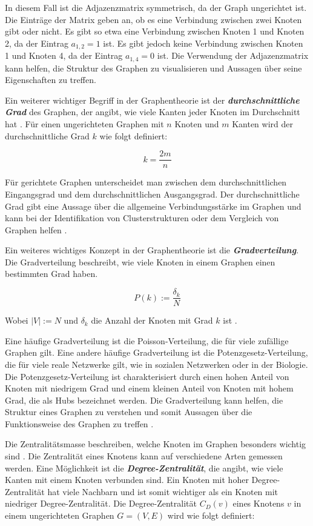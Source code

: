 In diesem Fall ist die Adjazenzmatrix symmetrisch, da der Graph ungerichtet ist. Die Einträge der Matrix geben an, ob es eine Verbindung zwischen zwei Knoten gibt oder nicht. Es gibt so etwa eine Verbindung zwischen Knoten 1 und Knoten 2, da der Eintrag $a_{1,2} = 1$ ist. Es gibt jedoch keine Verbindung zwischen Knoten 1 und Knoten 4, da der Eintrag $a_{1,4} = 0$ ist. Die Verwendung der Adjazenzmatrix kann helfen, die Struktur des Graphen zu visualisieren und Aussagen über seine Eigenschaften zu treffen.

Ein weiterer wichtiger Begriff in der Graphentheorie ist der \textbf{\textit{durchschnittliche Grad}} des Graphen, der angibt, wie viele Kanten jeder Knoten im Durchschnitt hat \cite[p.~48]{barabasi_network_2016}. Für einen ungerichteten Graphen mit $n$ Knoten und $m$ Kanten wird der durchschnittliche Grad $k$ wie folgt definiert:

$$k = \frac{2m}{n}$$

Für gerichtete Graphen unterscheidet man zwischen dem durchschnittlichen Eingangsgrad und dem durchschnittlichen Ausgangsgrad. Der durchschnittliche Grad gibt eine Aussage über die allgemeine Verbindungsstärke im Graphen und kann bei der Identifikation von Clusterstrukturen oder dem Vergleich von Graphen helfen \cite[p.~48]{barabasi_network_2016}.

Ein weiteres wichtiges Konzept in der Graphentheorie ist die \textbf{\textit{Gradverteilung}}. Die Gradverteilung beschreibt, wie viele Knoten in einem Graphen einen bestimmten Grad haben.

$$ P(k) := \frac{\delta_k}{N}$$

Wobei $|V| := N$ und $ \delta_k $ die Anzahl der Knoten mit Grad $k$ ist \cite[p.~311]{emmert-streib_mathematical_2020}.

Eine häufige Gradverteilung ist die Poisson-Verteilung, die für viele zufällige Graphen gilt. Eine andere häufige Gradverteilung ist die Potenzgesetz-Verteilung, die für viele reale Netzwerke gilt, wie in sozialen Netzwerken oder in der Biologie. Die Potenzgesetz-Verteilung ist charakterisiert durch einen hohen Anteil von Knoten mit niedrigem Grad und einem kleinen Anteil von Knoten mit hohem Grad, die als Hubs bezeichnet werden. Die Gradverteilung kann helfen, die Struktur eines Graphen zu verstehen und somit Aussagen über die Funktionsweise des Graphen zu treffen \cite[p.~51]{barabasi_network_2016}.

Die Zentralitätsmasse beschreiben, welche Knoten im Graphen besonders wichtig sind \cite[p.~313]{emmert-streib_mathematical_2020}.
Die Zentralität eines Knotens kann auf verschiedene Arten gemessen werden.
Eine Möglichkeit ist die \textbf{\textit{Degree-Zentralität}}, die angibt, wie viele Kanten mit einem Knoten verbunden sind.
Ein Knoten mit hoher Degree-Zentralität hat viele Nachbarn und ist somit wichtiger als ein Knoten mit niedriger Degree-Zentralität.
Die Degree-Zentralität $C_D(v)$ eines Knotens $v$ in einem ungerichteten Graphen $G=(V,E)$ wird wie folgt definiert:

